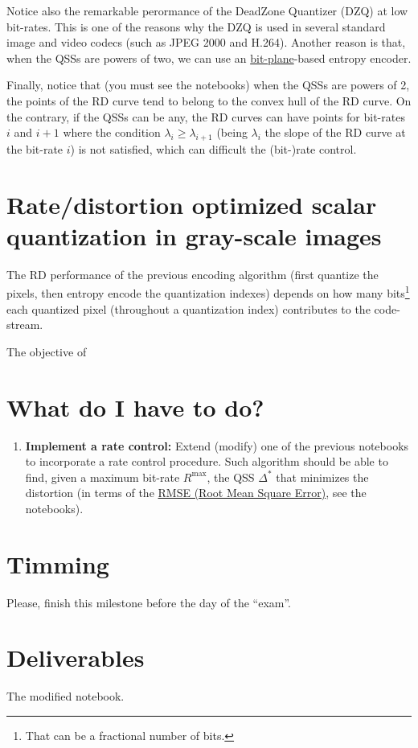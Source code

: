 Notice also the remarkable perormance of the DeadZone Quantizer (DZQ)
at low bit-rates. This is one of the reasons why the DZQ is used in
several standard image and video codecs (such as JPEG 2000 and
H.264). Another reason is that, when the QSSs are powers of two, we
can use an
\href{https://en.wikipedia.org/wiki/Bit_plane}{bit-plane}-based
entropy encoder.

Finally, notice that (you must see the notebooks) when the QSSs are
powers of 2, the points of the RD curve tend to belong to the convex
hull of the RD curve. On the contrary, if the QSSs can be any, the RD
curves can have points for bit-rates $i$ and $i+1$ where the condition
$\lambda_i\ge\lambda_{i+1}$ (being $\lambda_i$ the slope of the RD
curve at the bit-rate $i$) is not satisfied, which can difficult the
(bit-)rate control.

\section{Rate/distortion optimized scalar quantization in gray-scale images}
The RD performance of the previous encoding algorithm (first quantize
the pixels, then entropy encode the quantization indexes) depends on
how many bits\footnote{That can be a fractional number of bits.} each
quantized pixel (throughout a quantization index) contributes to the
code-stream.

The objective of 

\section{What do I have to do?}
\begin{enumerate}
\item \textbf{Implement a rate control:} Extend (modify) one of the
  previous notebooks to incorporate a rate control procedure. Such
  algorithm should be able to find, given a maximum bit-rate
  $R^\text{max}$, the QSS $\Delta^*$ that minimizes the distortion (in
  terms of the
  \href{https://en.wikipedia.org/wiki/Root-mean-square_deviation}{RMSE
    (Root Mean Square Error)}, see the notebooks).
\end{enumerate}

\section{Timming}
Please, finish this milestone before the day of the ``exam''.

\section{Deliverables}
The modified notebook.

